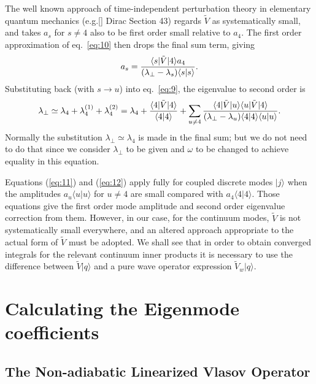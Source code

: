 \documentclass[12pt]{article}
\def\ket#1{|#1\rangle}
\def\bra#1{\langle#1}
\begin{document}
The well known approach of time-independent perturbation theory in
elementary quantum mechanics (e.g.[] Dirac Section 43) regards $\tilde{V}$ as
systematically small, and takes $a_s$ for $s\not=4$ also to be first
order small relative to $a_4$. The first order approximation of eq.\
\ref{eq:10} then drops the final sum term, giving
\begin{equation}
  \label{eq:11}
  a_s = {\bra{s}|\tilde{V}\ket{4}a_4\over (\lambda_\perp-\lambda_s)\bra{s}\ket{s}}.
\end{equation}
Substituting back (with $s\to u$) into eq.\ \ref{eq:9}, the
eigenvalue to second order is
\begin{equation}
  \label{eq:12}
 \lambda_\perp\simeq \lambda_4+\lambda_{4}^{(1)}+\lambda_{4}^{(2)}=\lambda_4
  +{\bra{4}|\tilde{V}\ket{4}\over \bra{4}\ket{4}}
    +\sum_{u\not=4}
    {\bra{4}|\tilde{V}\ket{u}\bra{u}|\tilde{V}\ket{4}\over
      (\lambda_\perp-\lambda_u)\bra{4}\ket{4}\bra{u}\ket{u}}.
\end{equation}
Normally the substitution $\lambda_\perp\simeq\lambda_4$ is made in
the final sum; but we do not need to do that since we consider
$\lambda_\perp$ to be given and $\omega$ to be changed to achieve
equality in this equation.

Equations (\ref{eq:11}) and (\ref{eq:12}) apply fully for coupled
discrete modes $\ket{j}$ when the amplitudes $a_u\bra{u}\ket{u}$
for $u\not=4$ are small compared with $a_4\bra{4}\ket{4}$. Those
equations give the first order mode amplitude and second order
eigenvalue correction from them.  However, in our case, for the
continuum modes, $\tilde{V}$ is not systematically small everywhere,
and an altered approach appropriate to the actual form of $\tilde{V}$
must be adopted. We shall see that in order to obtain converged
integrals for the relevant continuum inner products it is necessary to
use the difference between $\tilde V \ket{q}$ and a pure wave operator
expression $\tilde V_w\ket{q}$.


\section{Calculating the Eigenmode coefficients}
\subsection{The Non-adiabatic Linearized Vlasov Operator}
\end{document}
